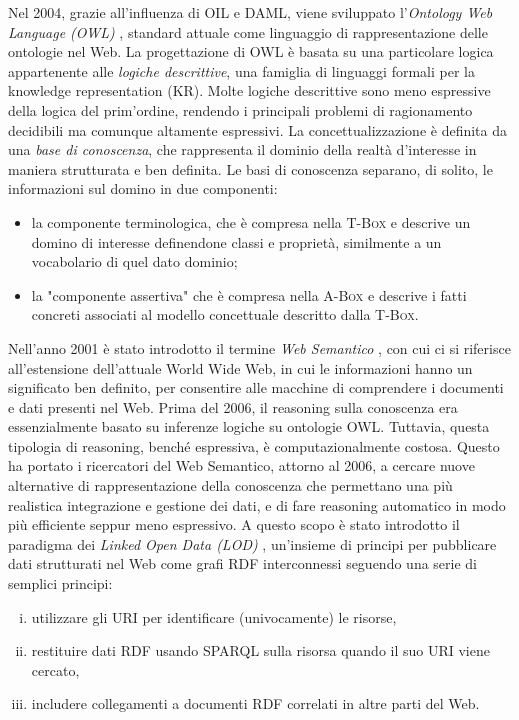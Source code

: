 Nel 2004, grazie all'influenza di OIL e DAML, viene sviluppato l'\textit{Ontology Web Language (OWL)} \cite{OWL}, standard attuale come linguaggio di rappresentazione delle ontologie nel Web. La progettazione di OWL è basata su una particolare logica appartenente alle \textit{logiche descrittive}, una famiglia di linguaggi formali per la knowledge representation (KR). Molte logiche descrittive sono meno espressive della logica del prim'ordine, rendendo i principali problemi di ragionamento decidibili ma comunque altamente espressivi. La concettualizzazione è definita da una \textit{base di conoscenza}, che rappresenta il dominio della realtà d'interesse in maniera strutturata e ben definita. Le basi di conoscenza separano, di solito, le informazioni sul domino in due componenti:
\begin{itemize}
	\item la componente terminologica, che è compresa nella \textsc{T-Box} e descrive un domino di interesse definendone classi e proprietà, similmente a un vocabolario di quel dato dominio;
	\item la "componente assertiva" che è compresa nella \textsc{A-Box} e descrive i fatti concreti associati al modello concettuale descritto dalla \textsc{T-Box}.
\end{itemize}
\noindent
Nell'anno 2001 è stato introdotto il termine \emph{Web Semantico} \cite{berners2001semantic}, con cui ci si riferisce all'estensione dell'attuale World Wide Web, in cui le informazioni hanno un significato ben definito, per consentire alle macchine di comprendere i documenti e dati presenti nel Web. Prima del 2006, il reasoning sulla conoscenza era essenzialmente basato su inferenze logiche su ontologie OWL. Tuttavia, questa tipologia di reasoning, benché espressiva, è computazionalmente costosa. Questo ha portato i ricercatori del Web Semantico, attorno al 2006, a cercare nuove alternative di rappresentazione della conoscenza che permettano una più realistica integrazione e gestione dei dati, e di fare reasoning automatico in modo più efficiente seppur meno espressivo. A questo scopo è stato introdotto il paradigma dei \textit{Linked Open Data (LOD)} \cite{hitzler2021review}, un'insieme di principi per pubblicare dati strutturati nel Web come grafi RDF interconnessi seguendo una serie di semplici principi: 
\begin{enumerate}[(i)]
	\item utilizzare gli URI per identificare (univocamente) le risorse,
	\item restituire dati RDF usando SPARQL sulla risorsa quando il suo URI viene cercato, 
	\item includere collegamenti a documenti RDF correlati in altre parti del Web.
\end{enumerate}
